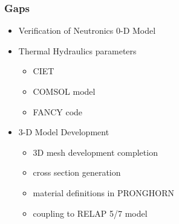 

\begin{frame}[fragile]
  \frametitle{Gaps}
  \begin{itemize}
    \item Verification of Neutronics 0-D Model
    \item Thermal Hydraulics parameters
    \begin{itemize}
      \item CIET
      \item COMSOL model
      \item FANCY code
    \end{itemize}
    \item 3-D Model Development 
    \begin{itemize}
      \item 3D mesh development completion
      \item cross section generation
      \item material definitions in PRONGHORN
      \item coupling to RELAP 5/7 model
    \end{itemize}
  \end{itemize}
\end{frame}

